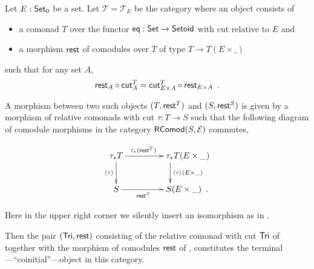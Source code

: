 \documentclass{amsart}
\begin{document}
\begin{theorem}\label{ex:final_sem_tri} %
   Let $E:\Set_0$ be a set.
   Let $\mathcal{T} = \mathcal{T}_E$ be the category where an object consists of
   \begin{itemize}
    \item a comonad $T$ over the functor $\eq:\Set\to\Setoid$ with cut relative to $E$ and
    \item a morphism $\tail$ of comodules over $T$ of type $T \to T(E\times \_)$
   \end{itemize}
   such that for any set $A$,
    \[ \comp{\cut^T_A}{\tail_A} = \comp{\tail_{E\times A}}{\cut^T_{E\times A}} \enspace . \]

   
   
   A morphism between two such objects $(T,\tail^T)$ and $(S,\tail^S)$
%    
%    
%    
   is given by a morphism of relative comonads with cut $\tau : T \to S$ such that
   the following diagram of comodule morphisms in the category $\RComod(S,\E)$ commutes,
   
   \[ \begin{xy}
       \xymatrix{   \tau_*T  \ar[r]^{\tau_*(\tail^T)} \ar[d]_{\induced{\tau}}  &  **[r] \tau_*T (E\times \_ )\ar[d]^{\induced{\tau}(E\times \_)} \\
                    S  \ar[r]_{\tail^S}  &  **[r] S (E\times \_ ) \enspace .
        }
      \end{xy}
   \]

   \noindent
   Here in the upper right corner we silently insert an isomorphism as in .
   
   Then the pair $(\Tri, \tail)$ consisting of the relative comonad with cut $\Tri$ of  together with 
    the morphism of comodules $\tail$ of ,
   constitutes the terminal---\enquote{coinitial}---object in this category.
   
\end{theorem}
\end{document}
